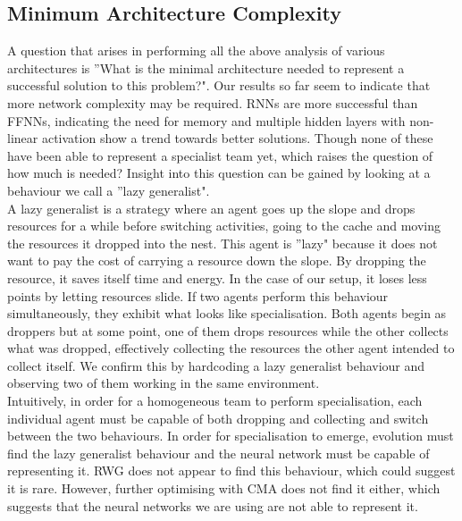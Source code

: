 \documentclass[12pt]{article}
\begin{document}
\subsection{Minimum Architecture Complexity} \label{lazy_generalist}

A question that arises in performing all the above analysis of various architectures is ''What is the minimal architecture needed to represent a successful solution to this problem?".
Our results so far seem to indicate that more network complexity may be required.
RNNs are more successful than FFNNs, indicating the need for memory and multiple hidden layers with non-linear activation show a trend towards better solutions.
Though none of these have been able to represent a specialist team yet, which raises the question of how much is needed?
Insight into this question can be gained by looking at a behaviour we call a ''lazy generalist".\\

A lazy generalist is a strategy where an agent goes up the slope and drops resources for a while before switching activities, going to the cache and moving the resources it dropped into the nest.
This agent is ''lazy" because it does not want to pay the cost of carrying a resource down the slope.
By dropping the resource, it saves itself time and energy.
In the case of our setup, it loses less points by letting resources slide.
If two agents perform this behaviour simultaneously, they exhibit what looks like specialisation.
Both agents begin as droppers but at some point, one of them drops resources while the other collects what was dropped, effectively collecting the resources the other agent intended to collect itself.
We confirm this by hardcoding a lazy generalist behaviour and observing two of them working in the same environment.\\

Intuitively, in order for a homogeneous team to perform specialisation, each individual agent must be capable of both dropping and collecting and switch between the two behaviours.
In order for specialisation to emerge, evolution must find the lazy generalist behaviour and the neural network must be capable of representing it.
RWG does not appear to find this behaviour, which could suggest it is rare.
However, further optimising with CMA does not find it either, which suggests that the neural networks we are using are not able to represent it.\\
\end{document}
